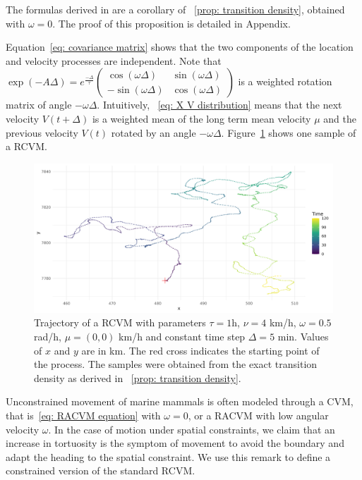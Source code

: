 \documentclass[11pt]{article}
\newcommand {\1}{\mathbb{1}}
\theoremstyle{definition}
\theoremstyle{remark}
\theoremstyle{remark}
\begin{document}
The formulas derived in \cite{johnson_continuoustime_2008} are a corollary of ~\ref{prop: transition density}, obtained with $\omega=0$. The proof of this proposition is detailed in Appendix.

Equation~\eqref{eq: covariance matrix} shows that the two components of the location and velocity processes are independent.
Note that $\exp(-A\Delta)=e^{\frac{-\Delta}{\tau}} \begin{pmatrix} \cos(\omega \Delta) & \sin(\omega \Delta) \\ -\sin(\omega \Delta) & \cos(\omega \Delta) \end{pmatrix}$ is a weighted rotation matrix of angle $-\omega \Delta$.
Intuitively, ~\eqref{eq: X V distribution} means that the next velocity $V(t+\Delta)$ is a weighted mean of the long term mean velocity $\mu$ and the previous velocity $V(t)$ rotated by an angle $-\omega \Delta$.
 Figure~\ref{fig: sample RACVM} shows one sample of a RCVM.\\



\begin{figure}[H]
	\centering
	\includegraphics[scale=0.3]{images/rcvm/illustrative_sample_standard.png}
	\caption{Trajectory of a RCVM with parameters $\tau=1$h, $\nu=4$ km/h, $\omega=0.5$ rad/h, $\mu=(0,0)$ km/h and constant time step $\Delta=5$ min. Values of $x$ and $y$ are in km. The red cross indicates the starting point of the process. The samples were obtained from the exact transition density as derived in ~\ref{prop: transition density}.}
	\label{fig: sample RACVM}
\end{figure}


Unconstrained movement of marine mammals  is often modeled through a CVM, that is~\eqref{eq: RACVM equation} with $\omega=0$, or a RACVM with low angular velocity $\omega$.
In the case of motion under spatial constraints, we claim that an increase in tortuosity is the symptom of movement to avoid the boundary and adapt the heading to the spatial constraint. We use this remark to define a constrained version of the standard RCVM.
 
\end{document}

